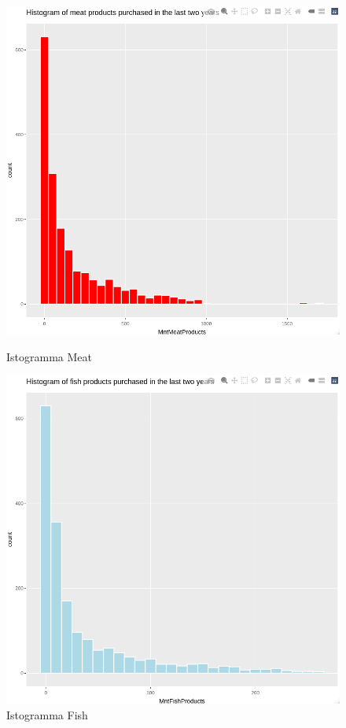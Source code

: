 \documentclass[letterpaper,11pt]{article}
\begin{document}
\begin{figure}[H]
  \centering
  \begin{minipage}[b]{0.4\textwidth}
    \includegraphics[width=\textwidth]{Img/EDA/EDA050.png}
    \caption{Istogramma Meat}
     \label{fig:IstogrammaMeat}
  \end{minipage}
  \hfill
  \begin{minipage}[b]{0.4\textwidth}
    \includegraphics[width=\textwidth]{Img/EDA/EDA051.png}
    \caption{Istogramma Fish}
     \label{fig:IstogrammaFish}
  \end{minipage}
\end{figure}
\end{document}
